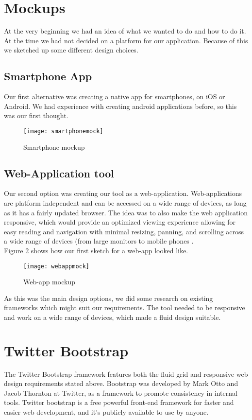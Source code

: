 \section{Mockups}
At the very beginning we had an idea of what we wanted to do and how to do it. At the time we had not decided on a platform for our application. Because of this we sketched up some different design choices.

\subsection{Smartphone App}
Our first alternative was creating a native app for smartphones, on iOS or Android. We had experience with creating android applications before, so this was our first thought. 
\begin{figure}[H]
\centering
	\texttt{[image: smartphonemock]}
\caption{Smartphone mockup}
\label{smartphonemock}
\end{figure}

\subsection{Web-Application tool}
Our second option was creating our tool as a web-application. Web-applications are platform independent and can be accessed on a wide range of devices, as long as it has a fairly updated browser. The idea was to also make the web application responsive, which would provide an optimized viewing experience allowing for easy reading and navigation with minimal resizing, panning, and scrolling across a wide range of devices (from large monitors to mobile phones .\\
Figure \ref{webappmock} shows how our first sketch for a web-app looked like.
\begin{figure}[H]
\centering 
	\texttt{[image: webappmock]}
\caption{Web-app mockup}
\label{webappmock}
\end{figure}
As this was the main design options, we did some research on existing frameworks which might suit our requirements. The tool needed to be responsive and work on a wide range of devices, which made a fluid design suitable.

\section{Twitter Bootstrap}
The Twitter Bootstrap framework\citep{twitterbootstrap} features both the fluid grid and responsive web design requirements stated above. Bootstrap was developed by Mark Otto and Jacob Thornton at Twitter, as a framework to promote consistency in internal tools\citep{buildingbootstrap}. Twitter bootstrap is a free powerful front-end framework for faster and easier web development, and it's publicly available to use by anyone.

